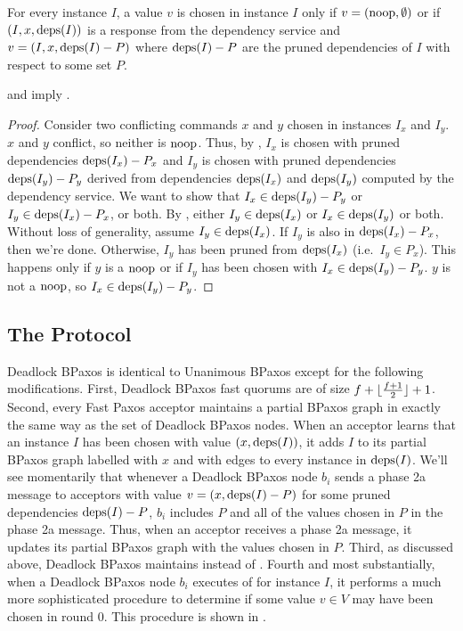\begin{invariant}
  For every instance $I$, a value $v$ is chosen in instance $I$ only if $v =
  (\text{noop}, \emptyset)$ or if $(I, x, \text{deps}(I))$ is a response from the
  dependency service and $v = (I, x, \text{deps}(I) - P)$ where $\text{deps}(I) - P$ are
  the pruned dependencies of $I$ with respect to some set $P$.
\end{invariant}

 and  imply
.
\begin{proof}
  Consider two conflicting commands $x$ and $y$ chosen in instances $I_x$ and
  $I_y$. $x$ and $y$ conflict, so neither is $\text{noop}$. Thus, by
  , $I_x$ is chosen with pruned dependencies
  $\text{deps}(I_x) - P_x$ and $I_y$ is chosen with pruned dependencies $\text{deps}(I_y) -
  P_y$ derived from dependencies $\text{deps}(I_x)$ and $\text{deps}(I_y)$ computed by the
  dependency service. We want to show that $I_x \in \text{deps}(I_y) - P_y$ or $I_y
  \in \text{deps}(I_x) - P_x$, or both.
  By , either $I_y \in \text{deps}(I_x)$ or $I_x \in
  \text{deps}(I_y)$ or both. Without loss of generality, assume $I_y \in \text{deps}(I_x)$.
  If $I_y$ is also in $\text{deps}(I_x) - P_x$, then we're done. Otherwise, $I_y$ has
  been pruned from $\text{deps}(I_x)$ (i.e.\ $I_y \in P_x$). This happens only if $y$
  is a $\text{noop}$ or if $I_y$ has been chosen with $I_x \in \text{deps}(I_y) - P_y$. $y$
  is not a $\text{noop}$, so $I_x \in \text{deps}(I_y) - P_y$.
\end{proof}

\subsection{The Protocol}
Deadlock BPaxos is identical to Unanimous BPaxos except for the
following modifications.
%
First, Deadlock BPaxos fast quorums are of size $f + \lfloor\frac{f + 1}{2}\rfloor + 1$.
%
Second, every Fast Paxos acceptor maintains a partial BPaxos graph in exactly
the same way as the set of Deadlock BPaxos nodes. When an acceptor learns that
an instance $I$ has been chosen with value $(x, \text{deps}(I))$, it adds $I$ to its
partial BPaxos graph labelled with $x$ and with edges to every instance in
$\text{deps}(I)$.  We'll see momentarily that whenever a Deadlock BPaxos node $b_i$
sends a phase 2a message to acceptors with value $v = (x, \text{deps}(I) - P)$ for
some pruned dependencies $\text{deps}(I) - P$, $b_i$ includes $P$ and all of the
values chosen in $P$ in the phase 2a message. Thus, when an acceptor receives a
phase 2a message, it updates its partial BPaxos graph with the values chosen in
$P$.
%
Third, as discussed above, Deadlock BPaxos maintains
 instead of .
%
Fourth and most substantially, when a Deadlock BPaxos node $b_i$ executes
 of  for instance $I$, it
performs a much more sophisticated procedure to determine if some value $v \in
V$ may have been chosen in round $0$. This procedure is shown in
.

